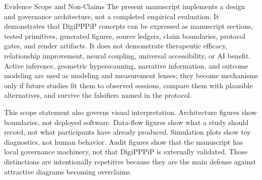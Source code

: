 \documentclass[
  ignorenonframetext,
]{beamer}
\begin{document}
\begin{frame}[allowframebreaks]{Evidence Scope and Non-Claims}
\protect{}\label{evidence-scope-and-non-claims}
The present manuscript implements a design and governance architecture,
not a completed empirical evaluation. It demonstrates that DigiPPPiP
concepts can be expressed as manuscript sections, tested primitives,
generated figures, source ledgers, claim boundaries, protocol gates, and
render artifacts. It does not demonstrate therapeutic efficacy,
relationship improvement, neural coupling, universal accessibility, or
AI benefit. Active inference, geometric hyperscanning, narrative
information, and outcome modeling are used as modeling and measurement
lenses; they become mechanisms only if future studies fit them to
observed sessions, compare them with plausible alternatives, and survive
the falsifiers named in the protocol.

This scope statement also governs visual interpretation. Architecture
figures show boundaries, not deployed software. Data-flow figures show
what a study should record, not what participants have already produced.
Simulation plots show toy diagnostics, not human behavior. Audit figures
show that the manuscript has local governance machinery, not that
DigiPPPiP is externally validated. Those distinctions are intentionally
repetitive because they are the main defense against attractive diagrams
becoming overclaims.
\end{frame}
\end{document}
